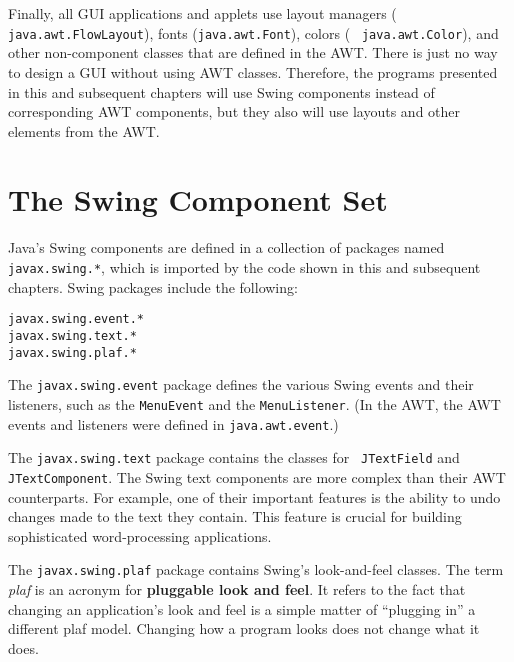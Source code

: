 Finally, all GUI applications and applets use layout managers ({\tt
java.\-awt.FlowLayout}), fonts ({\tt java.awt.Font}), colors ( {\tt
java.awt.Color}), and other non-component classes that are defined in
the AWT. There is just no way to design a GUI without using AWT classes.
Therefore, the programs presented in this and subsequent chapters will
use Swing components instead of corresponding AWT components, but
they also will use layouts and other elements from the AWT.



\section{The Swing Component Set}

\noindent Java's Swing components are defined in a
collection of packages named {\tt javax.swing.*}, which is imported by
the code shown in this and subsequent chapters.  Swing packages
include the following:

\begin{jjjlisting}
\begin{lstlisting}
javax.swing.event.*
javax.swing.text.*
javax.swing.plaf.*
\end{lstlisting}
\end{jjjlisting}

\noindent The {\tt javax.swing.event} package defines the
various Swing events and their listeners, such as the {\tt MenuEvent}
and the {\tt MenuListener}.  (In the AWT, the AWT events and
listeners were defined in {\tt java.awt.event}.)

The {\tt javax.swing.text} package contains the classes for {\tt
JTextField} and {\tt JTextComponent}.  The Swing text components are
more complex than their AWT counterparts.  For example, one of their
important features is the ability to undo changes made to the text
they contain.  This feature is crucial for building sophisticated
word-processing applications.

The {\tt javax.swing.plaf} package contains Swing's look-and-feel
classes.  The term {\it plaf} is an acronym for {\bf pluggable
look and feel}. It refers to the fact that changing an application's
look and feel is a simple matter of ``plugging in'' a different plaf
model.  Changing how a program looks does not change what it does.

